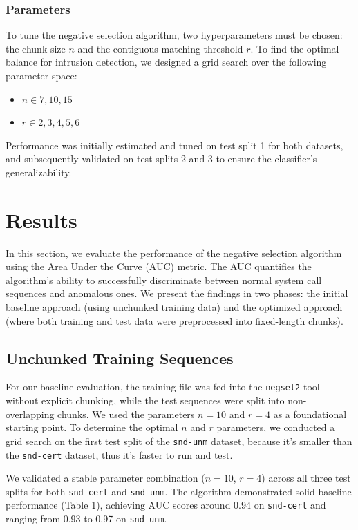 \documentclass{article}
\begin{document}
\subsubsection{Parameters}
To tune the negative selection algorithm, two hyperparameters must be chosen: the chunk size $n$ and the contiguous matching threshold $r$. To find the optimal balance for intrusion detection, we designed a grid search over the following parameter space:
\begin{itemize}
    \item $n \in {7, 10, 15}$
    \item $r \in {2, 3, 4, 5, 6}$
\end{itemize}
Performance was initially estimated and tuned on test split 1 for both datasets, and subsequently validated on test splits 2 and 3 to ensure the classifier's generalizability.

\section{Results}
In this section, we evaluate the performance of the negative selection algorithm using the Area Under the Curve (AUC) metric. The AUC quantifies the algorithm's ability to successfully discriminate between normal system call sequences and anomalous ones. We present the findings in two phases: the initial baseline approach (using unchunked training data) and the optimized approach (where both training and test data were preprocessed into fixed-length chunks).

\subsection{Unchunked Training Sequences}
For our baseline evaluation, the training file was fed into the \texttt{negsel2} tool without explicit chunking, while the test sequences were split into non-overlapping chunks. We used the parameters $n = 10$ and $r = 4$ as a foundational starting point. To determine the optimal $n$ and $r$ parameters, we conducted a grid search on the first test split of the \texttt{snd-unm} dataset, because it's smaller than the \texttt{snd-cert} dataset, thus it's faster to run and test.

We validated a stable parameter combination ($n=10$, $r=4$) across all three test splits for both \texttt{snd-cert} and \texttt{snd-unm}. The algorithm demonstrated solid baseline performance (Table 1), achieving AUC scores around 0.94 on \texttt{snd-cert} and ranging from 0.93 to 0.97 on \texttt{snd-unm}.
\end{document}
